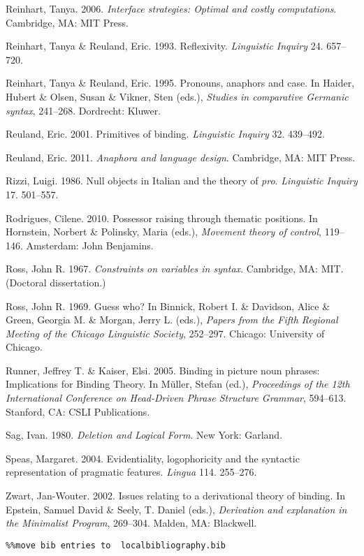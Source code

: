 \documentclass[output=paper]{langsci/langscibook}
\begin{document}
Reinhart, Tanya. 2006. \textit{Interface strategies: Optimal and costly computations}. Cambridge, MA: MIT Press.

Reinhart, Tanya \& Reuland, Eric. 1993. Reflexivity. \textit{Linguistic Inquiry} 24. 657–720.

Reinhart, Tanya \& Reuland, Eric. 1995. Pronouns, anaphors and case. In Haider, Hubert \& Olsen, Susan \& Vikner, Sten (eds.), \textit{Studies in comparative Germanic syntax}, 241–268. Dordrecht: Kluwer.

Reuland, Eric. 2001. Primitives of binding. \textit{Linguistic Inquiry} 32. 439–492.

Reuland, Eric. 2011. \textit{Anaphora and language design}. Cambridge, MA: MIT Press.

Rizzi, Luigi. 1986. Null objects in Italian and the theory of \textit{pro}. \textit{Linguistic Inquiry} 17. 501–557.

Rodrigues, Cilene. 2010. Possessor raising through thematic positions. In Hornstein, Norbert \& Polinsky, Maria (eds.), \textit{Movement theory of control}, 119–146. Amsterdam: John Benjamins.

Ross, John R. 1967. \textit{Constraints on variables in syntax}. Cambridge, MA: MIT. (Doctoral dissertation.)

Ross, John R. 1969. Guess who? In Binnick, Robert I. \& Davidson, Alice \& Green, Georgia M. \& Morgan, Jerry L. (eds.), \textit{Papers from the Fifth Regional Meeting of the Chicago Linguistic Society}, 252–297. Chicago: University of Chicago.

Runner, Jeffrey T. \& Kaiser, Elsi. 2005. Binding in picture noun phrases: Implications for Binding Theory. In Müller, Stefan (ed.), \textit{Proceedings of the 12th International Conference on Head-Driven Phrase Structure Grammar}, 594–613. Stanford, CA: CSLI Publications.

Sag, Ivan. 1980. \textit{Deletion and Logical Form}. New York: Garland.

Speas, Margaret. 2004. Evidentiality, logophoricity and the syntactic representation of pragmatic features. \textit{Lingua} 114. 255–276. 

Zwart, Jan-Wouter. 2002. Issues relating to a derivational theory of binding. In Epstein, Samuel David \& Seely, T. Daniel (eds.), \textit{Derivation and explanation in the Minimalist Program}, 269–304. Malden, MA: Blackwell.


\begin{verbatim}%%move bib entries to  localbibliography.bib
\end{verbatim} 

\sloppy
\printbibliography[heading=subbibliography,notkeyword=this] 
\end{document}
